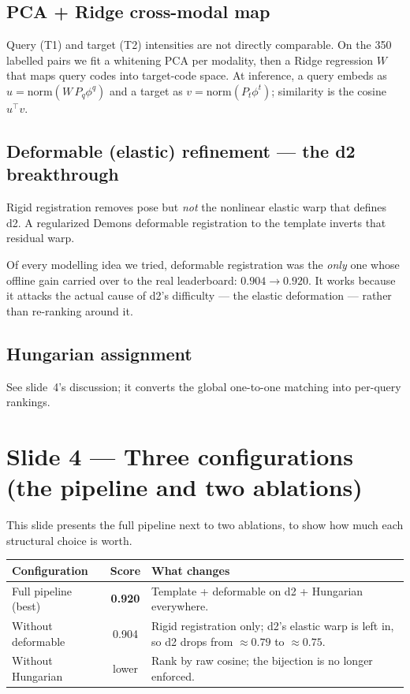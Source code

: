 \documentclass[12pt,a4paper]{article}   %
\begin{document}
\subsection{PCA + Ridge cross-modal map}
Query (T1) and target (T2) intensities are not directly comparable. On the 350 labelled pairs we
fit a whitening PCA per modality, then a Ridge regression $W$ that maps query codes into target-code
space. At inference, a query embeds as $u=\mathrm{norm}(W\,P_q\phi^q)$ and a target as
$v=\mathrm{norm}(P_t\phi^t)$; similarity is the cosine $u^\top v$.

\subsection{Deformable (elastic) refinement --- the d2 breakthrough}
Rigid registration removes pose but \emph{not} the nonlinear elastic warp that defines d2. A
regularized Demons deformable registration to the template inverts that residual warp.

\begin{noticethis}
Of every modelling idea we tried, deformable registration was the \emph{only} one whose offline
gain carried over to the real leaderboard: $0.904\to0.920$. It works because it attacks the actual
cause of d2's difficulty --- the elastic deformation --- rather than re-ranking around it.
\end{noticethis}

\subsection{Hungarian assignment}
See slide~4's discussion; it converts the global one-to-one matching into per-query rankings.

\section{Slide 4 --- Three configurations (the pipeline and two ablations)}
This slide presents the full pipeline next to two ablations, to show how much each structural choice
is worth.

\begin{center}\begin{tabularx}{\textwidth}{@{}l c X@{}}
\toprule
\textbf{Configuration} & \textbf{Score} & \textbf{What changes}\\
\midrule
Full pipeline (best) & \textbf{0.920} & Template + deformable on d2 + Hungarian everywhere.\\
Without deformable & 0.904 & Rigid registration only; d2's elastic warp is left in, so d2 drops from $\approx0.79$ to $\approx0.75$.\\
Without Hungarian & lower & Rank by raw cosine; the bijection is no longer enforced.\\
\bottomrule
\end{tabularx}\end{center}
\end{document}
